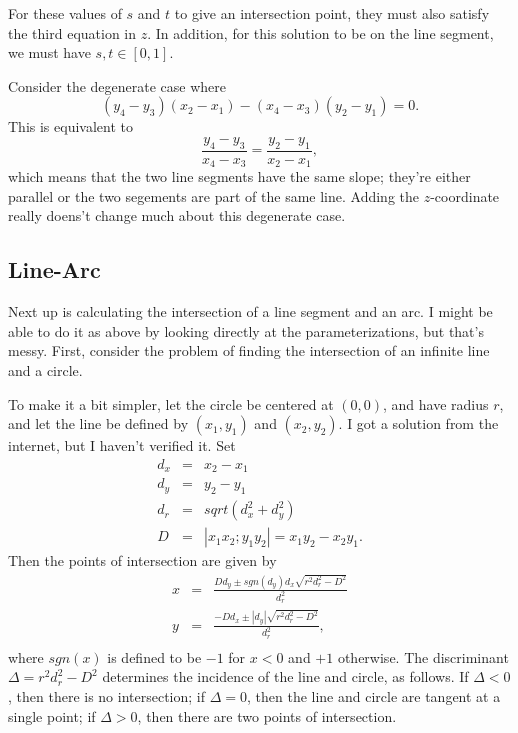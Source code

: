 \documentclass[titlepage,oneside,10pt]{article}
\begin{document}
For these values of $s$ and $t$ to give an intersection point, they
must also satisfy the third equation in $z$. In addition, for this
solution to be on the line segment, we must have $s,t\in[0,1]$.

Consider the degenerate case where
$$(y_4-y_3)(x_2-x_1) - (x_4-x_3)(y_2-y_1) = 0.$$
This is equivalent to
$$\frac{y_4-y_3}{x_4-x_3} = \frac{y_2-y_1}{x_2-x_1},$$
which means that the two line segments have the same slope; they're either
parallel or the two segements are part of the same line. Adding the
$z$-coordinate really doens't change much about this degenerate case.

\subsection{Line-Arc}

Next up is calculating the intersection of a line segment and an
arc. I might be able to do it as above by looking directly at the
parameterizations, but that's messy. First, consider the problem of
finding the intersection of an infinite line and a circle. 

To make it a bit simpler, let the circle be centered at $(0,0)$, and
have radius $r$, and let the line be defined by $(x_1,y_1)$ and
$(x_2,y_2)$. I got a solution from the internet, but I haven't
verified it. Set
\begin{eqnarray*}
d_x &=& x_2-x_1\\
d_y &=& y_2-y_1\\
d_r &=& sqrt(d_x^2+d_y^2)\\
D &=& |x_1 x_2; y_1 y_2|=x_1y_2-x_2y_1.
\end{eqnarray*}
Then the points of intersection are given by
\begin{eqnarray*}
x &=& \frac{Dd_y\pm sgn(d_y)d_x\sqrt{r^2d_r^2-D^2}}{d_r^2}\\
y &=& \frac{-Dd_x\pm|d_y|\sqrt{r^2d_r^2-D^2}}{d_r^2},\\
\end{eqnarray*}
where $sgn(x)$ is defined to be $-1$ for $x<0$ and $+1$ otherwise. The
discriminant $\Delta=r^2d_r^2-D^2$ determines the incidence of the
line and circle, as follows. If $\Delta<0$, then there is no
intersection; if $\Delta =0$, then the line and circle are tangent at
a single point; if $\Delta>0$, then there are two points of intersection.
\end{document}
